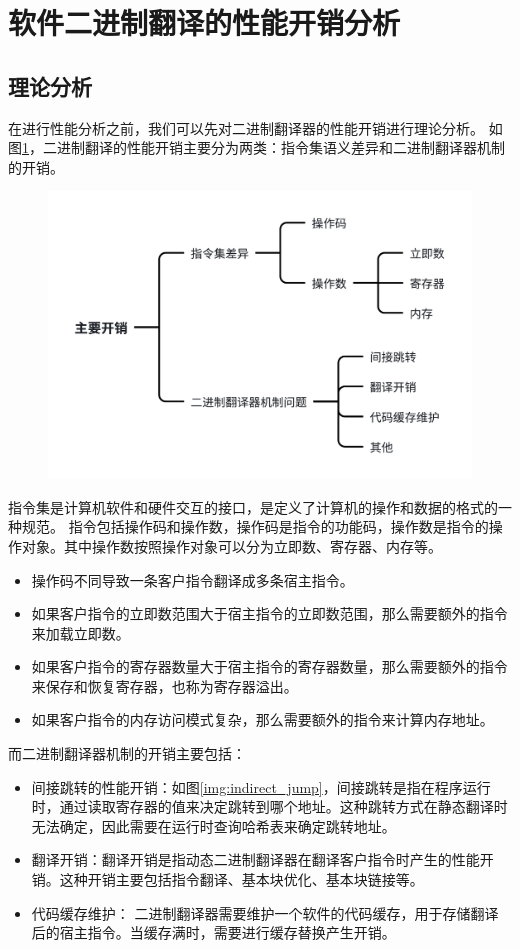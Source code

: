 \section{软件二进制翻译的性能开销分析}\label{sec:bt_overhead_all}

\subsection{理论分析}\label{sec:bt_overhead}

在进行性能分析之前，我们可以先对二进制翻译器的性能开销进行理论分析。
如图\ref{img:bt_overhead}，二进制翻译的性能开销主要分为两类：指令集语义差异和二进制翻译器机制的开销。

\begin{figure}[!htbp]
  \centering
  \includegraphics[width=0.7\linewidth]{./feishuImage/overhead_all.pdf}
  \label{img:bt_overhead}
\end{figure}

指令集是计算机软件和硬件交互的接口，是定义了计算机的操作和数据的格式的一种规范。
指令包括操作码和操作数，操作码是指令的功能码，操作数是指令的操作对象。其中操作数按照操作对象可以分为立即数、寄存器、内存等。
\begin{itemize}
\item 操作码不同导致一条客户指令翻译成多条宿主指令。
\item 如果客户指令的立即数范围大于宿主指令的立即数范围，那么需要额外的指令来加载立即数。
\item 如果客户指令的寄存器数量大于宿主指令的寄存器数量，那么需要额外的指令来保存和恢复寄存器，也称为寄存器溢出。
\item 如果客户指令的内存访问模式复杂，那么需要额外的指令来计算内存地址。
\end{itemize}

而二进制翻译器机制的开销主要包括：
\begin{itemize}
\item 间接跳转的性能开销：如图\ref{img:indirect_jump}，间接跳转是指在程序运行时，通过读取寄存器的值来决定跳转到哪个地址。这种跳转方式在静态翻译时无法确定，因此需要在运行时查询哈希表来确定跳转地址。
\item 翻译开销：翻译开销是指动态二进制翻译器在翻译客户指令时产生的性能开销。这种开销主要包括指令翻译、基本块优化、基本块链接等。
\item 代码缓存维护： 二进制翻译器需要维护一个软件的代码缓存，用于存储翻译后的宿主指令。当缓存满时，需要进行缓存替换产生开销。
\end{itemize}

